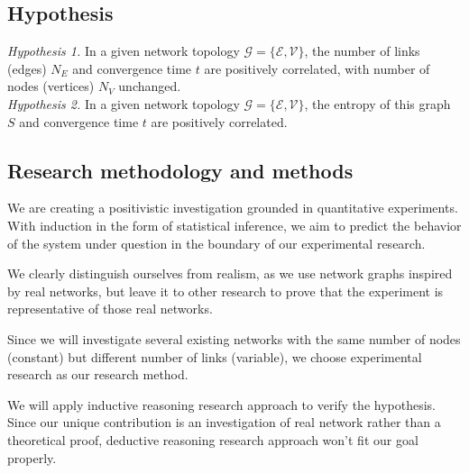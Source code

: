 \subsection{Hypothesis}
{\it Hypothesis 1.} In a given network topology $\mathcal{G}=\{\mathcal{E}, \mathcal{V}\}$, the number of links (edges) $N_E$ and convergence time $t$ are positively correlated, with number of nodes (vertices) $N_V$ unchanged.\\
{\it Hypothesis 2.} In a given network topology $\mathcal{G}=\{\mathcal{E}, \mathcal{V}\}$, the entropy of this graph $S$ and convergence time $t$ are positively correlated.

\subsection{Research methodology and methods}
We are creating a positivistic investigation grounded in quantitative experiments. With induction in the form of statistical inference, we aim to predict the behavior of the system under question in the boundary of our experimental research.

We clearly distinguish ourselves from realism, as we use network graphs inspired by real networks, but leave it to other research to prove that the experiment is representative of those real networks.

Since we will investigate several existing networks with the same number of nodes (constant) but different number of links (variable), we choose experimental research as our research method.

We will apply inductive reasoning research approach to verify the hypothesis. Since our unique contribution is an investigation of real network rather than a theoretical proof, deductive reasoning research approach won't fit our goal properly. 
